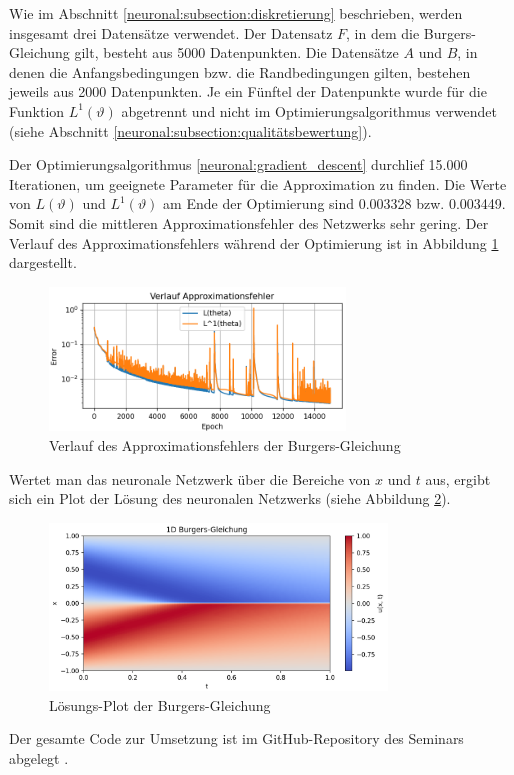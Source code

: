 Wie im Abschnitt \ref{neuronal:subsection:diskretierung} beschrieben, werden insgesamt drei Datensätze verwendet.
Der Datensatz \( F \), in dem die Burgers-Gleichung gilt, besteht aus 5000 Datenpunkten.
Die Datensätze \( A \) und \( B \), in denen die Anfangsbedingungen bzw. die Randbedingungen gilten, bestehen jeweils aus 2000 Datenpunkten.
Je ein Fünftel der Datenpunkte wurde für die Funktion \( L^1(\vartheta) \) abgetrennt und nicht im Optimierungsalgorithmus verwendet (siehe Abschnitt \ref{neuronal:subsection:qualitätsbewertung}).

Der Optimierungsalgorithmus \ref{neuronal:gradient_descent} durchlief 15.000 Iterationen, um geeignete Parameter für die Approximation zu finden.
Die Werte von \( L(\vartheta) \) und \( L^1(\vartheta) \) am Ende der Optimierung sind 0.003328 bzw. 0.003449.
Somit sind die mittleren Approximationsfehler des Netzwerks sehr gering.
Der Verlauf des Approximationsfehlers während der Optimierung ist in Abbildung \ref{fig:fehler_burgers} dargestellt.
\begin{figure}
    \centering
    \hspace*{-0.1\textwidth}
    \includegraphics[width=0.7\textwidth]{papers/neuronal/images/approximation_error_burgers.png}
    \caption{Verlauf des Approximationsfehlers der Burgers-Gleichung}
    \label{fig:fehler_burgers}
\end{figure}

Wertet man das neuronale Netzwerk über die Bereiche von \( x \) und \( t \) aus, ergibt sich ein Plot der Lösung des neuronalen Netzwerks (siehe Abbildung \ref{fig:loesung_burgers}).
\begin{figure}
    \centering
    \includegraphics[width=0.8\textwidth]{papers/neuronal/images/prediction_burgers_net.png}
    \caption{Lösungs-Plot der Burgers-Gleichung}
    \label{fig:loesung_burgers}
\end{figure}

Der gesamte Code zur Umsetzung ist im GitHub-Repository des Seminars abgelegt \cite{neuronal:github_source_code}.

